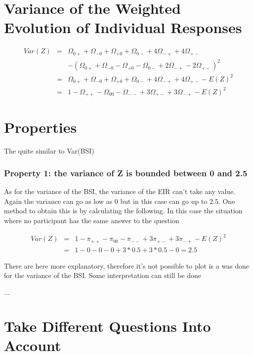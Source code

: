 \documentclass[12pt,a4paper,oneside]{book}
\begin{document}
\section{Variance of the Weighted Evolution of Individual Responses}


\begin{eqnarray}
Var(Z) &=& \Omega_{0+} + \Omega_{-0} + \Omega_{+0} + \Omega_{0-} +4\Omega_{-+} +4\Omega_{+-} \nonumber \nonumber \\ 
&&    - (\Omega_{0+} + \Omega_{-0} - \Omega_{+0} - \Omega_{0-} +2\Omega_{-+} -2\Omega_{+-})^2  \\
&=& \Omega_{0+} + \Omega_{-0} + \Omega_{+0} + \Omega_{0-} +4\Omega_{-+} +4\Omega_{+-} - E(Z)^2  \\
&=& 1 - \Omega_{++} - \Omega_{00} - \Omega_{--} + 3\Omega_{+-} + 3\Omega_{-+} - E(Z)^2
\end{eqnarray}


\section{Properties}

The 
quite similar to Var(BSI)


\subsubsection{Property 1: the variance of Z is bounded between 0 and 2.5}
As for the variance of the BSI, the variance of the EIR can't take any value.
Again the variance can go as low as 0 but in this case can go up to 2.5. One method to obtain this is by calculating the following. In this case the situation where no participant has the same answer to the question 

\begin{eqnarray}
Var(Z) &=& 1 - \pi_{++} - \pi_{00} - \pi_{--} + 3\pi_{+-} + 3\pi_{-+} - E(Z)^2 \nonumber \\
    &=& 1 - 0 - 0 - 0 + 3*0.5 + 3*0.5 - 0 = 2.5 \nonumber
\end{eqnarray}


 
There are here more explanatory, therefore it's not possible to plot is a was done for the variance of the BSI. Some interpretation can still be done

...

\section{Take Different Questions Into Account}
\end{document}
